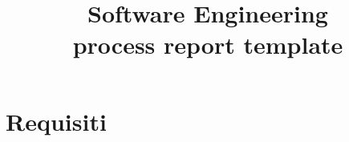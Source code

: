 \usepackage[a-1b]{pdfx}
\usepackage[%
  italian,            %
  nameinlink          %
]{cleveref}                     %



\title{Software Engineering\\
 process report template}

\author{\xauthA}


\maketitle




\section{Requisiti}


